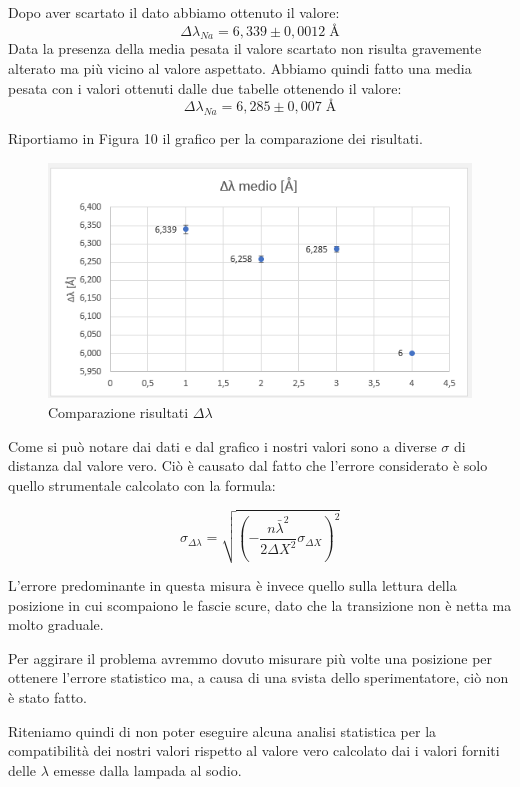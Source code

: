 \documentclass{article}
\begin{document}
\vspace{3mm}

Dopo aver scartato il dato abbiamo ottenuto il valore:
\[ \Delta \lambda_{Na} = 6,339 \pm 0,0012 \; \textrm{Å} \]
Data la presenza della media pesata il valore scartato non risulta gravemente alterato ma più vicino al valore aspettato.
Abbiamo quindi fatto una media pesata con i valori ottenuti dalle due tabelle ottenendo il valore:
\[ \Delta \lambda_{Na} = 6,285 \pm 0,007 \; \textrm{Å} \]

\clearpage
Riportiamo in Figura 10 il grafico per la comparazione dei risultati.


\begin{figure}[h!]
  \centering
  \includegraphics[width=0.6\linewidth]{IM grafico risultati delta lambda}
  \caption{Comparazione risultati $\Delta\lambda$}
\end{figure}


Come si può notare dai dati e dal grafico i nostri valori sono a diverse $\sigma$ di distanza dal valore vero. Ciò è causato dal fatto che l'errore considerato è solo quello strumentale calcolato con la formula:

\begin{equation} 
\sigma_{\Delta\lambda} = \sqrt{ (- \frac{n {\bar \lambda}^2}{2 \Delta X^2} \sigma_{\Delta X})^2} 
\end{equation}

L'errore predominante in questa misura è invece quello sulla lettura della posizione in cui scompaiono le fascie scure, dato che la transizione non è netta ma molto graduale.


Per aggirare il problema avremmo dovuto misurare più volte una posizione per ottenere l'errore statistico ma, a causa di una svista dello sperimentatore, ciò non è stato fatto. 

\vspace{3mm}

Riteniamo quindi di non poter eseguire alcuna analisi statistica per la compatibilità dei nostri valori rispetto al valore vero calcolato dai i valori forniti delle $\lambda$ emesse dalla lampada al sodio.
\end{document}
